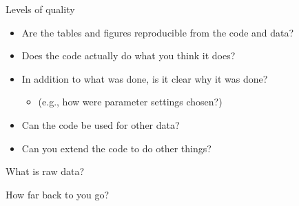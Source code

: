 \documentclass[12pt,t]{beamer}
\newcommand{\bi}{\begin{itemize}}
\newcommand{\ei}{\end{itemize}}
\begin{document}
\begin{frame}{Levels of quality}


\vspace{24pt}

\bi
\itemsep12pt
\item Are the tables and figures reproducible from the code and data?
\item Does the code actually do what you think it does?
\item In addition to {\color{hilight} what} was done, is it clear
  {\color{hilight} why} it was done?
  \bi
  \item[] (e.g., how were parameter settings chosen?)
  \ei
\item Can the code be used for other data?
\item Can you extend the code to do other things?
\ei

\end{frame}



\begin{frame}[c]{What is {\color{hilight} raw} data?}


\Large
\centering
How far back to you go?

\end{frame}
\end{document}
